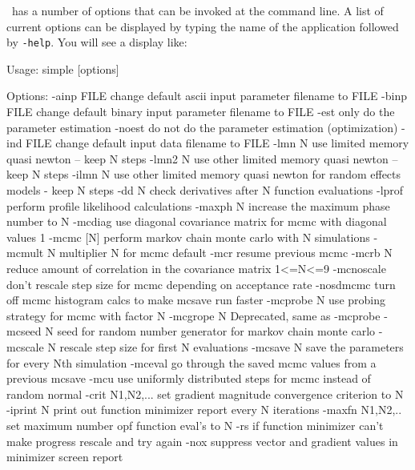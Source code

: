 %
%

\ADM\ has a number of options that can be invoked at the command line.
A list of current options can be displayed by typing the name of the application
followed by \texttt{-help}. You will see a display like:

\begin{code}
Usage: simple [options]

Options:
 -ainp FILE      change default ascii input parameter filename to FILE
 -binp FILE      change default binary input parameter filename to FILE
 -est            only do the parameter estimation
 -noest          do not do the parameter estimation (optimization)
 -ind FILE       change default input data filename to FILE
 -lmn N          use limited memory quasi newton -- keep N steps
 -lmn2 N         use other limited memory quasi newton -- keep N steps
 -ilmn N         use other limited memory quasi newton for random effects
                 models - keep N steps
 -dd N           check derivatives after N function evaluations
 -lprof          perform profile likelihood calculations
 -maxph N        increase the maximum phase number to N
 -mcdiag         use diagonal covariance matrix for mcmc with diagonal values 1
 -mcmc [N]       perform markov chain monte carlo with N simulations
 -mcmult N       multiplier N for mcmc default
 -mcr            resume previous mcmc
 -mcrb  N        reduce amount of correlation in the covariance matrix 1<=N<=9
 -mcnoscale      don't rescale step size for mcmc depending on acceptance rate
 -nosdmcmc       turn off mcmc histogram calcs to make mcsave run faster
 -mcprobe N      use probing strategy for mcmc with factor N
 -mcgrope N      Deprecated, same as -mcprobe
 -mcseed N       seed for random number generator for markov chain monte carlo
 -mcscale N      rescale step size for first N evaluations
 -mcsave N       save the parameters for every Nth simulation
 -mceval         go through the saved mcmc values from a previous mcsave
 -mcu            use uniformly distributed steps for mcmc instead of random normal
 -crit N1,N2,... set gradient magnitude convergence criterion to N
 -iprint N       print out function minimizer report every N iterations
 -maxfn N1,N2,.. set maximum number opf function eval's to N
 -rs             if function minimizer can't make progress rescale and try again
 -nox            suppress vector and gradient values in minimizer screen report

\end{code}
